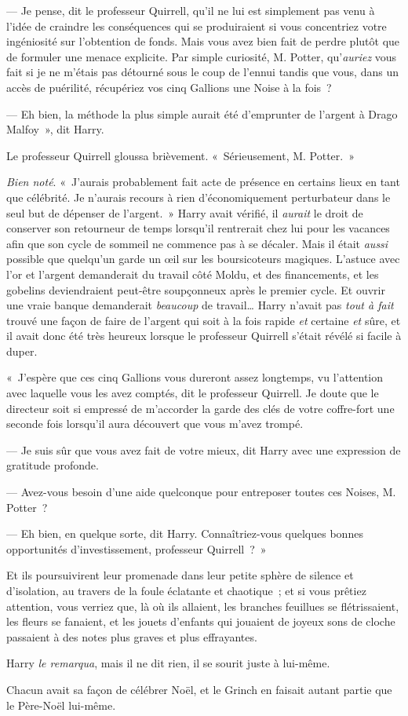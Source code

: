 --- Je pense, dit le professeur Quirrell, qu'il ne lui est simplement pas venu à l'idée de craindre les conséquences qui se produiraient si vous concentriez votre ingéniosité sur l'obtention de fonds. Mais vous avez bien fait de perdre plutôt que de formuler une menace explicite. Par simple curiosité, M. Potter, qu'\emph{auriez} vous fait si je ne m'étais pas détourné sous le coup de l'ennui tandis que vous, dans un accès de puérilité, récupériez vos cinq Gallions une Noise à la fois~?

--- Eh bien, la méthode la plus simple aurait été d'emprunter de l'argent à Drago Malfoy~», dit Harry.

Le professeur Quirrell gloussa brièvement. «~Sérieusement, M. Potter.~»

\emph{Bien noté}. «~J'aurais probablement fait acte de présence en certains lieux en tant que célébrité. Je n'aurais recours à rien d'économiquement perturbateur dans le seul but de dépenser de l'argent.~» Harry avait vérifié, il \emph{aurait} le droit de conserver son retourneur de temps lorsqu'il rentrerait chez lui pour les vacances afin que son cycle de sommeil ne commence pas à se décaler. Mais il était \emph{aussi} possible que quelqu'un garde un œil sur les boursicoteurs magiques. L'astuce avec l'or et l'argent demanderait du travail côté Moldu, et des financements, et les gobelins deviendraient peut-être soupçonneux après le premier cycle. Et ouvrir une vraie banque demanderait \emph{beaucoup} de travail… Harry n'avait pas \emph{tout à fait} trouvé une façon de faire de l'argent qui soit à la fois rapide \emph{et} certaine \emph{et} sûre, et il avait donc été très heureux lorsque le professeur Quirrell s'était révélé si facile à duper.

«~J'espère que ces cinq Gallions vous dureront assez longtemps, vu l'attention avec laquelle vous les avez comptés, dit le professeur Quirrell. Je doute que le directeur soit si empressé de m'accorder la garde des clés de votre coffre-fort une seconde fois lorsqu'il aura découvert que vous m'avez trompé.

--- Je suis sûr que vous avez fait de votre mieux, dit Harry avec une expression de gratitude profonde.

--- Avez-vous besoin d'une aide quelconque pour entreposer toutes ces Noises, M. Potter~?

--- Eh bien, en quelque sorte, dit Harry. Connaîtriez-vous quelques bonnes opportunités d'investissement, professeur Quirrell~?~»

Et ils poursuivirent leur promenade dans leur petite sphère de silence et d'isolation, au travers de la foule éclatante et chaotique~; et si vous prêtiez attention, vous verriez que, là où ils allaient, les branches feuillues se flétrissaient, les fleurs se fanaient, et les jouets d'enfants qui jouaient de joyeux sons de cloche passaient à des notes plus graves et plus effrayantes.

Harry \emph{le remarqua}, mais il ne dit rien, il se sourit juste à lui-même.

Chacun avait sa façon de célébrer Noël, et le Grinch en faisait autant partie que le Père-Noël lui-même.
